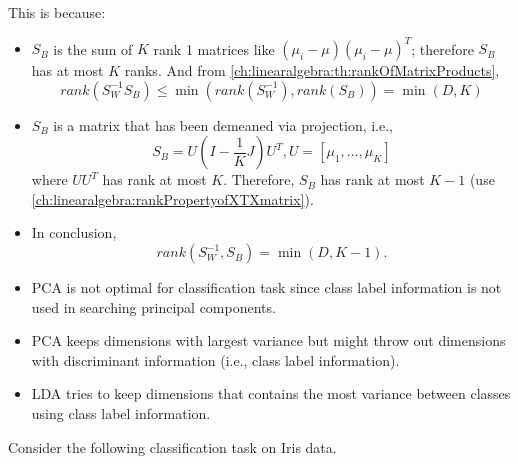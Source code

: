 \begin{refsection}
\begin{remark}
This is because:
\begin{itemize}
	\item $S_B$ is the sum of $K$ rank 1 matrices like $(\mu_i - \mu)(\mu_i - \mu)^T$; therefore $S_B$ has at most $K$ ranks. And from \autoref{ch:linearalgebra:th:rankOfMatrixProducts}, $$rank(S_W^{-1}S_B)\leq \min(rank(S_W^{-1}),rank(S_B)) = \min(D, K)$$
	\item $S_B$ is a matrix that has been demeaned via projection, i.e., 
	$$S_B = U(I - \frac{1}{K}J)U^T, U = [\mu_1,...,\mu_K]$$
	where $UU^T$ has rank at most $K$. Therefore, $S_B$ has rank at most $K-1$ (use \autoref{ch:linearalgebra:rankPropertyofXTXmatrix}). 
	\item In conclusion, 
	$$rank(S_W^{-1},S_B) = \min(D, K-1).$$
\end{itemize} 		
\end{remark}



\begin{remark}\hfill
	\begin{itemize}
		\item PCA is not optimal for classification task since class label information is not used in searching principal components.
		\item PCA keeps dimensions with largest variance but might throw out dimensions with discriminant information (i.e., class label information).
		\item LDA tries to keep dimensions that contains the most variance between classes using class label information.
	\end{itemize}	
\end{remark}


\begin{example}
	Consider the following classification task on Iris data. 
	
	
\end{example}


\end{refsection}
